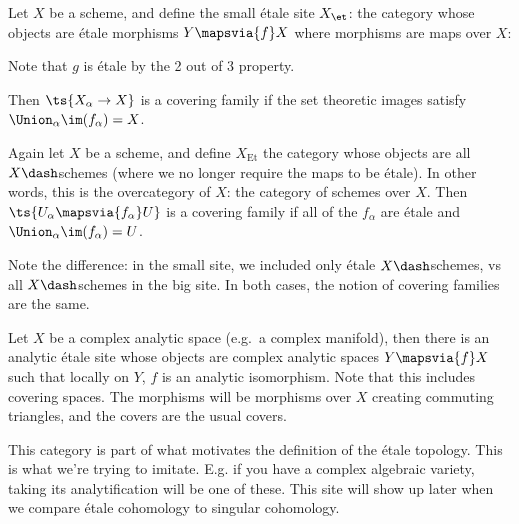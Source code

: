 \begin{example}

Let \(X\) be a scheme, and define the small étale site \(X_{\et}\): the
category whose objects are étale morphisms \(Y\mapsvia{f} X\) where
morphisms are maps over \(X\):

\begin{center}
\end{center}

Note that \(g\) is étale by the 2 out of 3 property.

Then \(\ts{X_\alpha\to X}\) is a covering family if the set theoretic
images satisfy \(\Union_\alpha \im(f_\alpha) = X\).

\end{example}

\begin{example}

Again let \(X\) be a scheme, and define \(X_{\mathrm{Et}}\) the category
whose objects are all \(X\dash\)schemes (where we no longer require the
maps to be étale). In other words, this is the overcategory of \(X\):
the category of schemes over \(X\). Then
\(\ts{U_\alpha\mapsvia{f_\alpha}U}\) is a covering family if all of the
\(f_\alpha\) are étale and \(\Union_\alpha \im(f_\alpha) = U\).

\end{example}

Note the difference: in the small site, we included only étale
\(X\dash\)schemes, vs all \(X\dash\)schemes in the big site. In both
cases, the notion of covering families are the same.

\begin{example}[?]

Let \(X\) be a complex analytic space (e.g.~a complex manifold), then
there is an analytic étale site whose objects are complex analytic
spaces \(Y\mapsvia{f} X\) such that locally on \(Y\), \(f\) is an
analytic isomorphism. Note that this includes covering spaces. The
morphisms will be morphisms over \(X\) creating commuting triangles, and
the covers are the usual covers.

\end{example}

\begin{remark}

This category is part of what motivates the definition of the étale
topology. This is what we're trying to imitate. E.g. if you have a
complex algebraic variety, taking its analytification will be one of
these. This site will show up later when we compare étale cohomology to
singular cohomology.

\end{remark}

